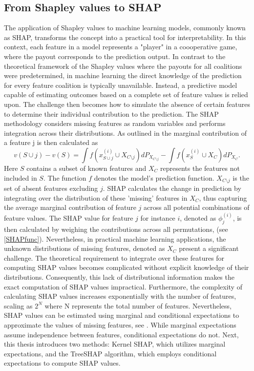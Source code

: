 \documentclass[12pt]{article}
\begin{document}
\subsection{From Shapley values to SHAP}
The application of Shapley values to machine learning models, commonly known as SHAP, transforms the concept into a practical tool for interpretability. In this context, each feature in a model represents a "player" in a coooperative game, where the payout corresponds to the prediction output. 
In contrast to the theoretical framework of the Shapley values where the payouts for all coalitions were predetermined, in machine learning the direct knowledge of the prediction for every feature coalition is typically unavailable. Instead, a predictive model capable of estimating outcomes based on a complete set of feature values is relied upon. The challenge then becomes how to simulate the absence of certain features to determine their individual contribution to the prediction.
The SHAP methodology considers missing features as random variables and performs integration across their distributions.
As outlined in \citet[Section~5.4]{molnarSHAP} the marginal contribution of a feature j is then calculated as 
\begin{equation}
v(S \cup j) - v(S) = \int f(x_{S \cup j}^{(i)} \cup X_{C\setminus j})dP_{X_{C\setminus j}} 
- \int f(x_S^{(i)} \cup X_C)dP_{X_C}.
\end{equation}
Here $S$ contains a subset of known features and $X_C$ represents the features not included in $S$. The function $f$ denotes the model's prediction function. $X_{C\setminus j}$ is the set of absent features excluding $j$.
SHAP calculates the change in prediction by integrating over the distribution of these 'missing' features in $X_C$, thus capturing the average marginal contribution of feature $j$ across all potential combinations of feature values. 
The SHAP value for feature $j$ for instance $i$, denoted as $\phi^{(i)}_j$, is then calculated by weighing the contributions across all permutations, (see \ref{SHAPfunc}).
Nevertheless, in practical machine learning applications, the unknown distributions of missing features, denoted as $X_C$ present a significant challenge. The theoretical requirement to integrate over these features for computing SHAP values becomes complicated without explicit knowledge of their distributions.
Consequently, this lack of distributional information makes the exact computation of SHAP values impractical. Furthermore, the complexity of calculating SHAP values increases exponentially with the number of features, scaling as $2^N$ where N represents the total number of features.
Nevertheless, SHAP values can be estimated using marginal and conditional expectations to approximate the values of missing features, see \citep[Section~4.1]{actuaries}. While marginal expectations assume independence between features, conditional expectations do not. Next, this thesis introduces two methods: Kernel SHAP, which utilizes marginal expectations, and the TreeSHAP algorithm, which employs conditional expectations to compute SHAP values.
\end{document}
